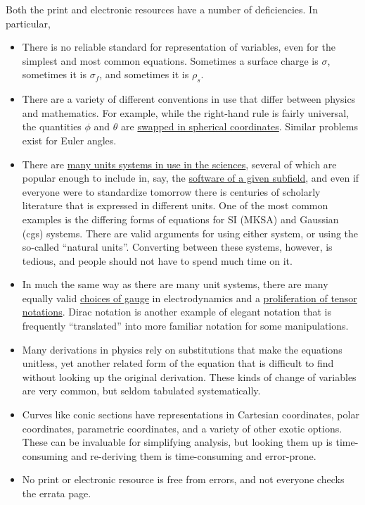 \documentclass[12pt,letterpaper]{article}
\begin{document}
Both the print and electronic resources have a number of deficiencies. In particular,
\begin{itemize}
\item There is no reliable standard for representation of variables, even for the simplest and most common equations. Sometimes a surface charge is $\sigma$, sometimes it is $\sigma_f$, and sometimes it is $\rho_s$.
\item There are a variety of different conventions in use that differ between physics and mathematics. For example, while the right-hand rule is fairly universal, the quantities $\phi$ and $\theta$ are \href{http://mathworld.wolfram.com/SphericalCoordinates.html}{swapped in spherical coordinates}. Similar problems exist for Euler angles.
\item There are \href{https://en.wikipedia.org/wiki/Systems_of_units}{many units systems in use in the sciences}, several of which are popular enough to include in, say, the \href{http://lammps.sandia.gov/doc/units.html}{software of a given subfield}, and even if everyone were to standardize tomorrow there is centuries of scholarly literature that is expressed in different units. One of the most common examples is the differing forms of equations for SI (MKSA) and Gaussian (cgs) systems. There are valid arguments for using either system, or using the so-called ``natural units''. Converting between these systems, however, is tedious, and people should not have to spend much time on it.
\item In much the same way as there are many unit systems, there are many equally valid \href{https://en.wikipedia.org/wiki/Gauge_fixing}{choices of gauge} in electrodynamics and a \href{https://en.wikipedia.org/wiki/Tensor_notation}{proliferation of tensor notations}. Dirac notation is another example of elegant notation that is frequently ``translated'' into more familiar notation for some manipulations. 
\item Many derivations in physics rely on substitutions that make the equations unitless, yet another related form of the equation that is difficult to find without looking up the original derivation. These kinds of change of variables are very common, but seldom tabulated systematically.
\item Curves like conic sections have representations in Cartesian coordinates, polar coordinates, parametric coordinates, and a variety of other exotic options. These can be invaluable for simplifying analysis, but looking them up is time-consuming and re-deriving them is time-consuming and error-prone.
\item No print or electronic resource is free from errors, and not everyone checks the errata page.
\end{itemize}
\end{document}
